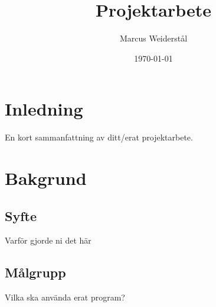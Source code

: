 \documentclass[a4paper]{article}
\title{Projektarbete}
\author{Marcus Weiderstål}
\date{\today}
\begin{document}
\ifpdf
{}
\else
{}
\fi

\maketitle



\pagestyle{fancyplain}
 
\fancyhf{}
 

\cfoot{\fancyplain{}{\thepage}}



\newpage
\tableofcontents

\newpage
\section{Inledning}
En kort sammanfattning av ditt/erat projektarbete.


\newpage
\section{Bakgrund}
\subsection{Syfte}
Varför gjorde ni det här
\subsection{Målgrupp}
Vilka ska använda erat program?
\end{document}

